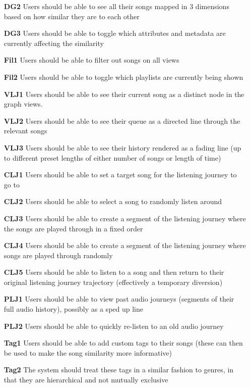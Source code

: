 \begin{itemize}
    \item[\textbf{DG2}] Users should be able to see all their songs mapped in 3 dimensions based on how similar they are to each other
    \item[\textbf{DG3}] Users should be able to toggle which attributes and metadata are currently affecting the similarity
    \item[\textbf{Fil1}] Users should be able to filter out songs on all views
    \item[\textbf{Fil2}] Users should be able to toggle which playlists are currently being shown
    \item[\textbf{VLJ1}] Users should be able to see their current song as a distinct node in the graph views.
    \item[\textbf{VLJ2}] Users should be able to see their queue as a directed line through the relevant songs
    \item[\textbf{VLJ3}] Users should be able to see their history rendered as a fading line (up to different preset lengths of either number of songs or length of time)
    \item[\textbf{CLJ1}] Users should be able to set a target song for the listening journey to go to
    \item[\textbf{CLJ2}] Users should be able to select a song to randomly listen around
    \item[\textbf{CLJ3}] Users should be able to create a segment of the listening journey where the songs are played through in a fixed order
    \item[\textbf{CLJ4}] Users should be able to create a segment of the listening journey where songs are played through randomly
    \item[\textbf{CLJ5}] Users should be able to listen to a song and then return to their original listening journey trajectory (effectively a temporary diversion)
    \item[\textbf{PLJ1}] Users should be able to view past audio journeys (segments of their full audio history), possibly as a sped up line
    \item[\textbf{PLJ2}] Users should be able to quickly re-listen to an old audio journey
    \item[\textbf{Tag1}] Users should be able to add custom tags to their songs (these can then be used to make the song similarity more informative)
    \item[\textbf{Tag2}] The system should treat these tags in a similar fashion to genres, in that they are hierarchical and not mutually exclusive
\end{itemize}

